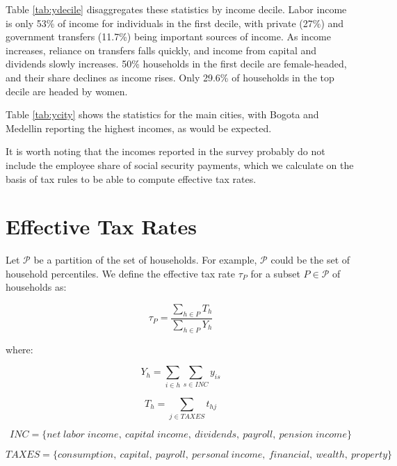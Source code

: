 \documentclass[12pt]{article}
\begin{document}
Table \ref{tab:ydecile} disaggregates these statistics by income decile.
Labor income is only 53\% of income for individuals in the first decile,
with private (27\%) and government transfers (11.7\%)
being important sources of income.
As income increases, reliance on transfers falls quickly,
and income from capital and dividends slowly increases.
50\% households in the first decile are female-headed,
and their share declines as income rises.
Only 29.6\% of households in the top decile are headed by women.

Table \ref{tab:ycity} shows the statistics for the main cities,
with Bogota and Medellin reporting the highest incomes, as would be expected.

It is worth noting that the incomes reported in the survey
probably do not include the employee share of social security payments,
which we calculate on the basis of tax rules
to be able to compute effective tax rates.

\section{Effective Tax Rates}

Let $\mathcal{P}$ be a partition of the set of households.
For example, $\mathcal{P}$ could be the set of household percentiles.
We define the effective tax rate $\tau_P$
for a subset $P\in\mathcal{P}$ of households as:

\begin{equation}
\tau_P = \frac{\sum_{h\in P}T_{h}} {\sum_{h\in P}Y_h}
\end{equation}

where:

\begin{equation}
Y_h = \sum_{i\in h}\sum_{s\in INC}y_{is}
\end{equation}

\begin{equation}
T_h = \sum_{j\in TAXES}t_{hj}
\end{equation}

\begin{equation}
    INC=\{net \; labor \;income,\ capital \;income,\  dividends,\  payroll,\  pension \;income\}
\end{equation}

\iffalse
[[SOMEONE:
    The way the definition of TAXES typesets is ugly.]]
\fi
\begin{equation}
    TAXES=\{consumption,\ capital,\  payroll,\ personal\ income,\ financial,\ wealth,\ property\}
\end{equation}
\end{document}
